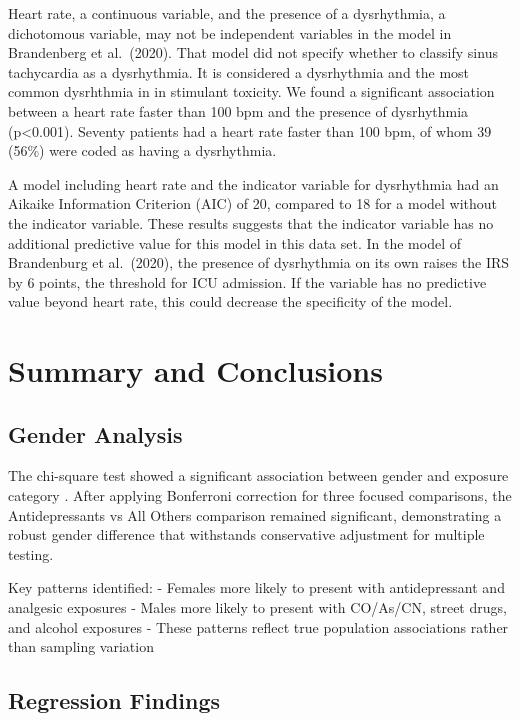 \documentclass[
]{article}
\begin{document}
Heart rate, a continuous variable, and the presence of a dysrhythmia, a dichotomous variable, may not be independent variables in the model in Brandenberg et al.~(2020). That model did not specify whether to classify sinus tachycardia as a dysrhythmia. It is considered a dysrhythmia and the most common dysrhthmia in in stimulant toxicity. We found a significant association between a heart rate faster than 100 bpm and the presence of dysrhythmia (p\textless0.001). Seventy patients had a heart rate faster than 100 bpm, of whom 39 (56\%) were coded as having a dysrhythmia.

A model including heart rate and the indicator variable for dysrhythmia had an Aikaike Information Criterion (AIC) of 20, compared to 18 for a model without the indicator variable. These results suggests that the indicator variable has no additional predictive value for this model in this data set. In the model of Brandenburg et al.~(2020), the presence of dysrhythmia on its own raises the IRS by 6 points, the threshold for ICU admission. If the variable has no predictive value beyond heart rate, this could decrease the specificity of the model.

\section{Summary and Conclusions}\label{summary-and-conclusions}

\subsection{Gender Analysis}\label{gender-analysis}

The chi-square test showed a significant association between gender and exposure category . After applying Bonferroni correction for three focused comparisons, the Antidepressants vs All Others comparison remained significant, demonstrating a robust gender difference that withstands conservative adjustment for multiple testing.

Key patterns identified:
- Females more likely to present with antidepressant and analgesic exposures
- Males more likely to present with CO/As/CN, street drugs, and alcohol exposures
- These patterns reflect true population associations rather than sampling variation

\subsection{Regression Findings}\label{regression-findings}
\end{document}
